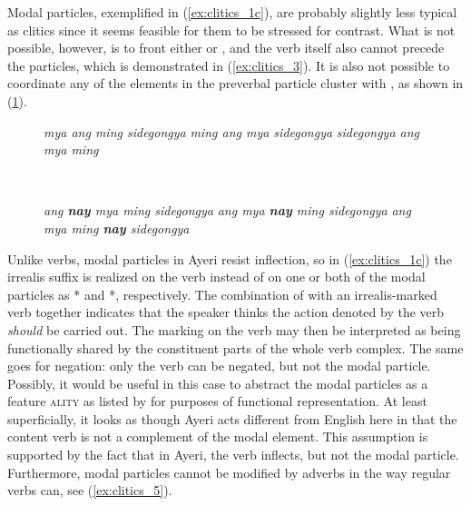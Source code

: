 \label{clitics_preverb_modal}
Modal particles, exemplified in (\ref{ex:clitics_1c}), are
probably slightly less typical as clitics since it seems feasible for them to
be stressed for contrast. What is not possible, however, is to front either
 or , and the verb itself
also cannot precede the particles, which is demonstrated in
(\ref{ex:clitics_3}). It is also not possible to coordinate any of the elements
in the preverbal particle cluster with , as shown in
(\ref{ex:clitics_4}).

\begin{figure}
\begin{minipage}[t]{.5\linewidth}%
\pex\label{ex:clitics_3}%
\a \ljudge{*} \textit{mya ang ming sidegongya}
\a \ljudge{*} \textit{ming ang mya sidegongya}
\a \ljudge{*} \textit{sidegongya ang mya ming}
\xe
\end{minipage}
~
\begin{minipage}[t]{.5\linewidth}%
\pex\label{ex:clitics_4}%
\a \ljudge{*} \textit{ang \textbf{nay} mya ming sidegongya}
\a \ljudge{*} \textit{ang mya \textbf{nay} ming sidegongya}
\a \ljudge{*} \textit{ang mya ming \textbf{nay} sidegongya}
\xe
\end{minipage}
\end{figure}

Unlike verbs, modal particles in Ayeri resist
inflection, so in (\ref{ex:clitics_1c}) the irrealis suffix 
is realized on the verb  instead
of on one or both of the modal particles as * and
*, respectively. The combination of  with an irrealis-marked verb together indicates that the speaker
thinks the action denoted by the verb \emph{should} be carried out. The marking
on the verb may then be interpreted as being functionally shared by the
constituent parts of the whole verb complex. The same goes for negation: only
the verb can be negated, but not the modal particle. Possibly, it would be
useful in this case to abstract the modal particles as a feature
\Mod{}\textsc{ality} as listed by \citet[Feature Table]{pargram} for purposes
of functional representation. At least superficially, it looks as though Ayeri
acts different from English here in that the content verb is not a complement
of the modal element. This assumption is supported by the fact that in Ayeri,
the verb inflects, but not the modal particle. Furthermore, modal particles
cannot be modified by adverbs in the way regular verbs can, see
(\ref{ex:clitics_5}).

